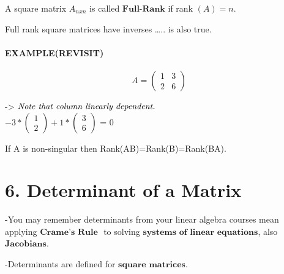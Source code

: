 \documentclass[]{article}
\let\oldparagraph\paragraph
\renewcommand{\paragraph}[1]{\oldparagraph{#1}\mbox{}}
\begin{document}
\begin{tcolorbox}[colback=green!5,colframe=red!40!black,title=Definition]
A square matrix $A_{nxn}$ is called $\textbf{Full-Rank}$ if rank $(A)=n$.



\end{tcolorbox}

Full rank square matrices have inverses \ldots{}.. is also true.

\paragraph{\texorpdfstring{EXAMPLE(REVISIT)\\
}{EXAMPLE(REVISIT) }}\label{examplerevisit}

\[A=\begin{pmatrix} 1 & 3 \\ 2 & 6 \end{pmatrix}\]

-\textgreater{}
\(\text{\textit{Note that column linearly dependent.}}\)\\

\(-3*\begin{pmatrix} 1 \\ 2 \end{pmatrix} + 1*\begin{pmatrix} 3 \\ 6 \end{pmatrix}\)
= 0\\

\begin{tcolorbox}[colback=green!5,colframe=blue!40!black,title=Theorem]
If A is non-singular then Rank(AB)=Rank(B)=Rank(BA). 



\end{tcolorbox}

\section{\texorpdfstring{6. Determinant of a Matrix\\
}{6. Determinant of a Matrix }}\label{determinant-of-a-matrix}

-You may remember determinants from your linear algebra courses mean
applying \(\textbf{Crame's Rule }\) to solving
\(\textbf{systems of linear equations}\), also \(\textbf{Jacobians}\).

-Determinants are defined for \(\textbf{square matrices}\).
\end{document}
